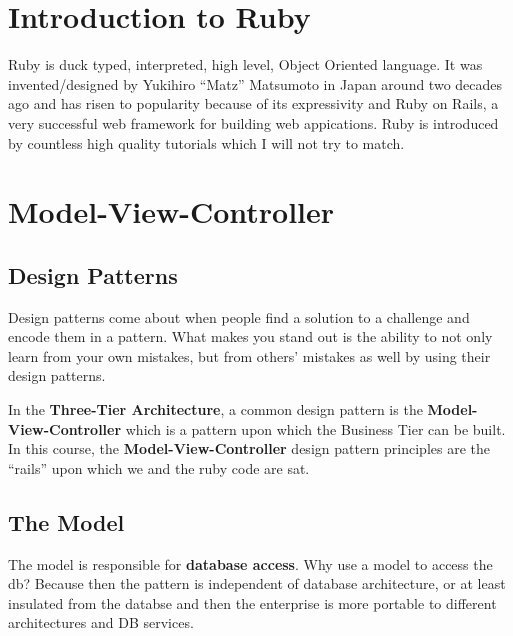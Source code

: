 \documentclass[11pt]{article}
\begin{document}
\section{Introduction to Ruby}
\label{sec:ruby}

Ruby is duck typed, interpreted, high level, Object Oriented language. It was invented/designed by Yukihiro ``Matz'' Matsumoto in Japan around two decades ago and has risen to popularity because of its expressivity and Ruby on Rails, a very successful web framework for building web appications. Ruby is introduced by countless high quality tutorials which I will not try to match.




\section{Model-View-Controller}
\label{sec:MVC}

\subsection{Design Patterns}
Design patterns come about when people find a solution to a challenge and encode them in a pattern. What makes you stand out is the ability to not only learn from your own mistakes, but from others' mistakes as well by using their design patterns.

In the \textbf{Three-Tier Architecture}, a common design pattern is the \textbf{Model-View-Controller} which is a pattern upon which the Business Tier can be built. In this course, the \textbf{Model-View-Controller} design pattern principles are the ``rails'' upon which we and the ruby code are sat.

\subsection{The Model}
The model is responsible for \textbf{database access}. Why use a model to access the db? Because then the pattern is independent of database architecture, or at least insulated from the databse and then the enterprise is more portable to different architectures and DB services.
\end{document}
